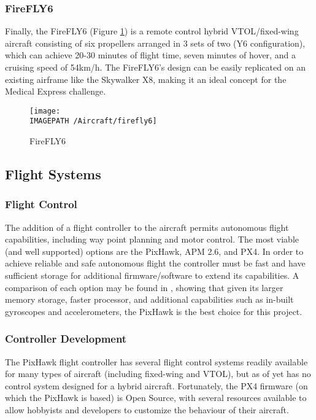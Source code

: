\subsubsection*{FireFLY6}
Finally, the FireFLY6\cite{ref:firefly6} (Figure \ref{fig:firefly6}) is a remote control hybrid VTOL/fixed-wing aircraft consisting of six propellers arranged in 3 sets of two (Y6 configuration), which can achieve 20-30 minutes of flight time, seven minutes of hover, and a cruising speed of 54km/h. The FireFLY6's design can be easily replicated on an existing airframe like the Skywalker X8, making it an ideal concept for the Medical Express challenge.\\

\begin{figure}[!h]
	\centering
	\texttt{[image: \\IMAGEPATH /Aircraft/firefly6]}
	\caption{FireFLY6}
	\label{fig:firefly6}
\end{figure}

\subsection{Flight Systems}
\subsubsection*{Flight Control}
The addition of a flight controller to the aircraft permits autonomous flight capabilities, including way point planning and motor control. The most viable (and well supported) options are the PixHawk\cite{ref:pixhawk}, APM 2.6\cite{ref:ardupilot}, and PX4\cite{ref:px4}. In order to achieve reliable and safe autonomous flight the controller must be fast and have sufficient storage for additional firmware/software to extend its capabilities. A comparison of each option may be found in \cite{ref:controller_comparison}, showing that given its larger memory storage, faster processor, and additional capabilities such as in-built gyroscopes and accelerometers, the PixHawk is the best choice for this project.

\subsubsection*{Controller Development}
The PixHawk flight controller has several flight control systems readily available for many types of aircraft (including fixed-wing and VTOL), but as of yet has no control system designed for a hybrid aircraft. Fortunately, the PX4 firmware (on which the PixHawk is based) is Open Source\cite{ref:ardupilotgit}, with several resources available\cite{ref:firmware1,ref:firmware2} to allow hobbyists and developers to customize the behaviour of their aircraft.

